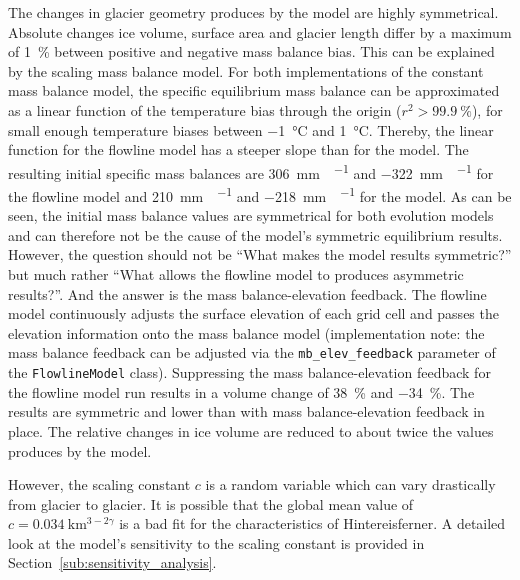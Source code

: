         The changes in glacier geometry produces by the \vas{} model are highly symmetrical. Absolute changes ice volume, surface area and glacier length differ by a maximum of \SI{1}{\percent} between positive and negative mass balance bias. This can be explained by the scaling mass balance model. For both implementations of the constant mass balance model, the specific equilibrium mass balance can be approximated as a linear function of the temperature bias through the origin ($r^2 > \SI{99.9}{\percent}$), for small enough temperature biases between \SI{-1}{\celsius} and \SI{+1}{\celsius}. Thereby, the linear function for the flowline model has a steeper slope than for the \vas{} model. The resulting initial specific mass balances are \SI{+306}{\milli\meter\waterequivalent\per\year} and \SI{-322}{\milli\meter\waterequivalent\per\year} for the flowline model and \SI{+210}{\milli\meter\waterequivalent\per\year} and \SI{-218}{\milli\meter\waterequivalent\per\year} for the \vas{} model. As can be seen, the initial mass balance values are symmetrical for both evolution models and can therefore not be the cause of the \vas{} model's symmetric equilibrium results.
        However, the question should not be ``What makes the \vas{} model results symmetric?'' but much rather ``What allows the flowline model to produces asymmetric results?''. And the answer is the mass balance-elevation feedback. The flowline model continuously adjusts the surface elevation of each grid cell and passes the elevation information onto the mass balance model (implementation note: the mass balance feedback can be adjusted via the \lstinline`mb_elev_feedback` parameter of the \lstinline`FlowlineModel` class). Suppressing the mass balance-elevation feedback for the flowline model run results in a volume change of \SI{+38}{\percent} and \SI{-34}{\percent}. The results are symmetric and lower than with mass balance-elevation feedback in place. The relative changes in ice volume are reduced to about twice the values produces by the \vas{} model.
        
        However, the scaling constant $c$ is a random variable which can vary drastically from glacier to glacier. It is possible that the global mean value of $c=\SI{0.034}{\kilo\meter^{3-2\gamma}}$ is a bad fit for the characteristics of Hintereisferner. A detailed look at the model's sensitivity to the scaling constant is provided in Section~\ref{sub:sensitivity_analysis}.

